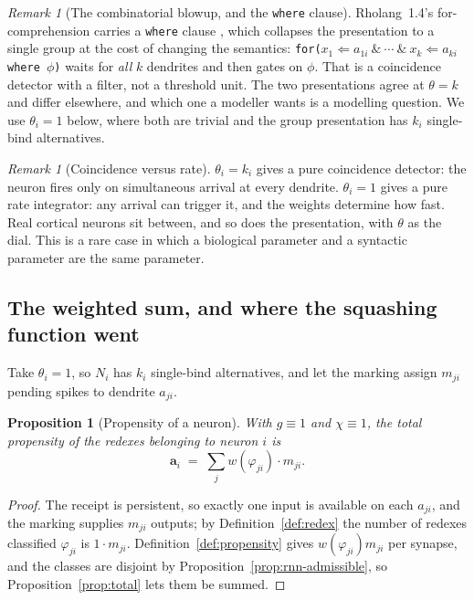 \documentclass[11pt,a4paper]{article}
\theoremstyle{plain}
\newtheorem{proposition}[theorem]{Proposition}
\theoremstyle{definition}
\theoremstyle{remark}
\newtheorem{remark}[theorem]{Remark}
\newcommand{\prop}{\mathbf{a}}
\newcommand{\wmap}{w}
\newcommand{\gfac}{g}
\begin{document}
\begin{remark}[The combinatorial blowup, and the \texttt{where} clause]
Rholang~1.4's for-comprehension carries a \texttt{where} clause \cite{omnibus}, which collapses the
presentation to a single group at the cost of changing the semantics: \texttt{for($x_1 \Leftarrow
a_{1i}\ \&\ \cdots\ \&\ x_k \Leftarrow a_{ki}$ where $\phi$)} waits for \emph{all} $k$ dendrites and
then gates on $\phi$. That is a coincidence detector with a filter, not a threshold unit. The two
presentations agree at $\theta = k$ and differ elsewhere, and which one a modeller wants is a
modelling question. We use $\theta_i = 1$ below, where both are trivial and the group presentation
has $k_i$ single-bind alternatives.
\end{remark}

\begin{remark}[Coincidence versus rate]
$\theta_i = k_i$ gives a pure coincidence detector: the neuron fires only on simultaneous arrival at
every dendrite. $\theta_i = 1$ gives a pure rate integrator: any arrival can trigger it, and the
weights determine how fast. Real cortical neurons sit between, and so does the presentation, with
$\theta$ as the dial. This is a rare case in which a biological parameter and a syntactic parameter
are the same parameter.
\end{remark}

\subsection{The weighted sum, and where the squashing function went}
\label{sec:squash}

Take $\theta_i = 1$, so $N_i$ has $k_i$ single-bind alternatives, and let the marking assign $m_{ji}$
pending spikes to dendrite $a_{ji}$.

\begin{proposition}[Propensity of a neuron]
\label{prop:neuron-prop}
With $\gfac \equiv 1$ and $\chi \equiv 1$, the total propensity of the redexes belonging to neuron
$i$ is
\[
\prop_i \;=\; \sum_{j} \wmap(\varphi_{ji}) \cdot m_{ji} .
\]
\end{proposition}

\begin{proof}
The receipt is persistent, so exactly one input is available on each $a_{ji}$, and the marking
supplies $m_{ji}$ outputs; by Definition~\ref{def:redex} the number of redexes classified
$\varphi_{ji}$ is $1 \cdot m_{ji}$. Definition~\ref{def:propensity} gives $\wmap(\varphi_{ji})m_{ji}$
per synapse, and the classes are disjoint by Proposition~\ref{prop:rnn-admissible}, so
Proposition~\ref{prop:total} lets them be summed.
\end{proof}
\end{document}

